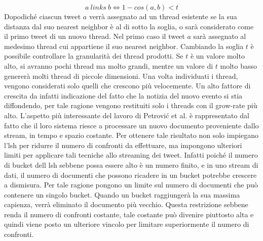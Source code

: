  \begin{equation}
  a \ links \ b \Longleftrightarrow 1-cos(a,b)<t
\end{equation}
Dopodiché ciascun tweet $a$  verrà  assegnato ad un thread esistente se la sua distanza dal suo nearest neighbor è al di sotto la soglia, o sarà considerato come il primo tweet di un nuovo thread. Nel primo caso il tweet $a$ sarà assegnato al medesimo thread cui appartiene il suo nearest neighbor. Cambiando la soglia $t$ 
è possibile controllare la granularità dei thread prodotti. Se $t$ è un valore molto alto, si avranno pochi thread ma molto grandi, mentre un valore di $t$ molto basso genererà molti thread di piccole dimensioni.
Una volta individuati i thread, vengono considerati solo quelli che crescono più velocemente. Un alto fattore di crescita da infatti indicazione del fatto che la notizia del nuovo evento si stia diffondendo,  per tale ragione vengono restituiti solo i threads con il grow-rate più alto. L'aspetto più interessante del lavoro di Petrovi\'c et al. \cite{Petrovic:2010:SFS:1857999.1858020} è rappresentato dal fatto che il loro sistema riesce a processare un nuovo documento proveniente dallo stream, in tempo e spazio costante.  Per ottenere tale risultato non solo impiegano l'lsh per ridurre il numero di confronti da effettuare, ma impongono ulteriori limiti per applicare tali tecniche allo streaming dei tweet. Infatti poiché il numero di bucket dell lsh sebbene possa essere alto è un numero finito, e in uno stream di dati, il numero di documenti che possono ricadere in un bucket potrebbe crescere a dismisura. Per tale ragione pongono un limite sul numero di documenti che può contenere un singolo bucket. Quando un bucket raggiungerà la sua massima capienza, verrà eliminato il documento più vecchio. Questa restrizione sebbene renda il numero di confronti costante, tale costante può divenire piuttosto alta e quindi viene posto un ulteriore vincolo per limitare superiormente il numero di confronti. 
